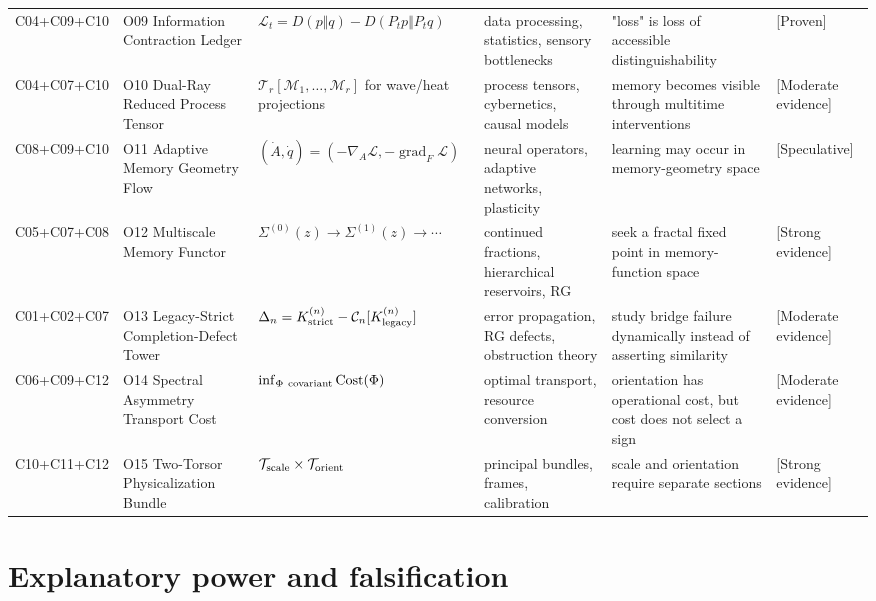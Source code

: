 \documentclass[11pt,a4paper,openany]{report}
\newcommand{\statusProven}{\textcolor{fingreen}{[Proven]}}
\newcommand{\statusStrong}{\textcolor{finblue}{[Strong evidence]}}
\newcommand{\statusModerate}{\textcolor{finviolet}{[Moderate evidence]}}
\newcommand{\statusSpeculative}{\textcolor{finorange}{[Speculative]}}
\begin{document}
\begin{center}
\begin{longtable}{@{}p{}p{}p{}p{}p{}p{}@{}}
C04+\allowbreak{}C09+\allowbreak{}C10 & O09 Information Contraction Ledger & \(\mathcal L_t=D(p\Vert q)-D(P_tp\Vert P_tq)\) & data processing, statistics, sensory bottlenecks & "loss" is loss of accessible distinguishability & \statusProven{} \\
C04+\allowbreak{}C07+\allowbreak{}C10 & O10 Dual-Ray Reduced Process Tensor & \(\mathcal T_r[\mathcal M_1,\ldots,\mathcal M_r]\) for wave/\allowbreak{}heat projections & process tensors, cybernetics, causal models & memory becomes visible through multitime interventions & \statusModerate{} \\
C08+\allowbreak{}C09+\allowbreak{}C10 & O11 Adaptive Memory Geometry Flow & \((\dot A,\dot q)=(-\nabla_A\mathcal L,-\operatorname{grad}_F\mathcal L)\) & neural operators, adaptive networks, plasticity & learning may occur in memory-geometry space & \statusSpeculative{} \\
C05+\allowbreak{}C07+\allowbreak{}C08 & O12 Multiscale Memory Functor & \(\Sigma^{(0)}(z)\to\Sigma^{(1)}(z)\to\cdots\) & continued fractions, hierarchical reservoirs, RG & seek a fractal fixed point in memory-function space & \statusStrong{} \\
C01+\allowbreak{}C02+\allowbreak{}C07 & O13 Legacy-Strict Completion-Defect Tower & \(\Delta_n=K_{\rm strict}^{(n)}-\mathcal C_n[K_{\rm legacy}^{(n)}]\) & error propagation, RG defects, obstruction theory & study bridge failure dynamically instead of asserting similarity & \statusModerate{} \\
C06+\allowbreak{}C09+\allowbreak{}C12 & O14 Spectral Asymmetry Transport Cost & \(\inf_{\Phi\ {\rm covariant}}\operatorname{Cost}(\Phi)\) & optimal transport, resource conversion & orientation has operational cost, but cost does not select a sign & \statusModerate{} \\
C10+\allowbreak{}C11+\allowbreak{}C12 & O15 Two-Torsor Physicalization Bundle & \(\mathcal T_{\rm scale}\times\mathcal T_{\rm orient}\) & principal bundles, frames, calibration & scale and orientation require separate sections & \statusStrong{} \\
\bottomrule
\end{longtable}
\endgroup
\end{center}

\chapter{Explanatory power and falsification}
\end{document}
